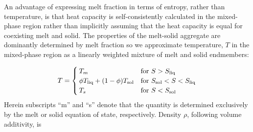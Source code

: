    An advantage of expressing melt fraction in terms of entropy, rather than temperature, is that heat capacity is self-consistently calculated in the mixed-phase region rather than implicitly assuming that the heat capacity is equal for coexisting melt and solid.  The properties of the melt-solid aggregate are dominantly determined by melt fraction so we approximate temperature, $T$ in the mixed-phase region as a linearly weighted mixture of melt and solid endmembers:

\begin{equation}
T=
\begin{cases}
\label{eqn:temperature_agg}
  T_m & \text{for } S>S_{\rm liq} \\
  \phi T_{\rm liq} + (1-\phi) T_{\rm sol} & \text{for } S_{\rm sol}<S<S_{\rm liq} \\  
  T_s & \text{for } S<S_{\rm sol}
\end{cases}
\end{equation}
Herein subscripts ``m'' and ``s'' denote that the quantity is determined exclusively by the melt or solid equation of state, respectively.  Density $\rho$, following volume additivity, is

